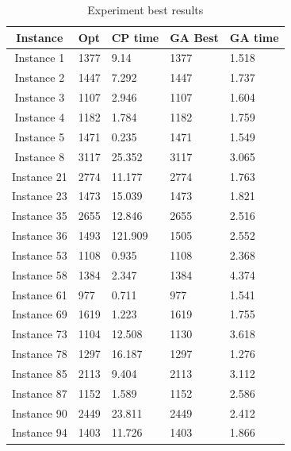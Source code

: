 \documentclass[twocolumn,10pt]{asme2ej}
\begin{document}
\begin{table}[t]
\caption{Experiment best results}
\label{tab:cpGaResults}
\begin{tabular}{|c|l|l|l|l|}
\hline
Instance & Opt & CP time & GA Best & GA time \\
\hline
Instance 1 & 1377 & 9.14 & 1377 & 1.518 \\
Instance 2 & 1447 & 7.292 & 1447 & 1.737 \\
Instance 3 & 1107 & 2.946 & 1107 & 1.604 \\
Instance 4 & 1182 & 1.784 & 1182 & 1.759 \\
Instance 5 & 1471 & 0.235 & 1471 & 1.549 \\
Instance 8 & 3117 & 25.352 & 3117 & 3.065 \\
Instance 21 & 2774 & 11.177 & 2774 & 1.763 \\
Instance 23 & 1473 & 15.039 & 1473 & 1.821 \\
Instance 35 & 2655 & 12.846 & 2655 & 2.516 \\
Instance 36 & 1493 & 121.909 & 1505 & 2.552 \\
Instance 53 & 1108 & 0.935 & 1108 & 2.368 \\
Instance 58 & 1384 & 2.347 & 1384 & 4.374 \\
Instance 61 & 977 & 0.711 & 977 & 1.541 \\
Instance 69 & 1619 & 1.223 & 1619 & 1.755 \\
Instance 73 & 1104 & 12.508 & 1130 & 3.618 \\
Instance 78 & 1297 & 16.187 & 1297 & 1.276 \\
Instance 85 & 2113 & 9.404 & 2113 & 3.112 \\
Instance 87 & 1152 & 1.589 & 1152 & 2.586 \\
Instance 90 & 2449 & 23.811  & 2449 & 2.412 \\
Instance 94 & 1403 & 11.726 & 1403 & 1.866 \\

\hline
\end{tabular}
\end{table}
\end{document}

